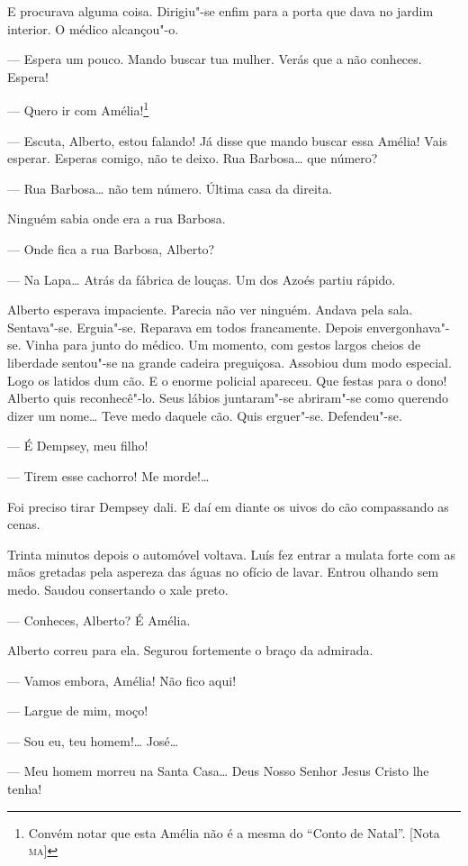 E procurava alguma coisa. Dirigiu"-se enfim para a porta que dava no
jardim interior. O médico alcançou"-o.

--- Espera um pouco. Mando buscar tua mulher. Verás que a não conheces.
Espera!

--- Quero ir com Amélia!\footnote{Convém notar que esta Amélia não é a
  mesma do ``Conto de Natal''. {[}Nota \textsc{ma}{]}}

--- Escuta, Alberto, estou falando! Já disse que mando buscar essa
Amélia! Vais esperar. Esperas comigo, não te deixo. Rua Barbosa\ldots{} que
número?

--- Rua Barbosa\ldots{} não tem número. Última casa da direita.

Ninguém sabia onde era a rua Barbosa.

--- Onde fica a rua Barbosa, Alberto?

--- Na Lapa\ldots{} Atrás da fábrica de louças. Um dos Azoés partiu rápido.

Alberto esperava impaciente. Parecia não ver ninguém. Andava pela sala.
Sentava"-se. Erguia"-se. Reparava em todos francamente. Depois
envergonhava"-se. Vinha para junto do médico. Um momento, com gestos
largos cheios de liberdade sentou"-se na grande cadeira preguiçosa.
Assobiou dum modo especial. Logo os latidos dum cão. E o enorme policial
apareceu. Que festas para o dono! Alberto quis reconhecê"-lo. Seus lábios
juntaram"-se abriram"-se como querendo dizer um nome\ldots{} Teve medo daquele
cão. Quis erguer"-se. Defendeu"-se.

--- É Dempsey, meu filho!

--- Tirem esse cachorro! Me morde!\ldots{}

Foi preciso tirar Dempsey dali. E daí em diante os uivos do cão
compassando as cenas.

Trinta minutos depois o automóvel voltava. Luís fez entrar a mulata
forte com as mãos gretadas pela aspereza das águas no ofício de lavar.
Entrou olhando sem medo. Saudou consertando o xale preto.

--- Conheces, Alberto? É Amélia.

Alberto correu para ela. Segurou fortemente o braço da admirada.

--- Vamos embora, Amélia! Não fico aqui!

--- Largue de mim, moço!

--- Sou eu, teu homem!\ldots{} José\ldots{}

--- Meu homem morreu na Santa Casa\ldots{} Deus Nosso Senhor Jesus Cristo lhe
tenha!

